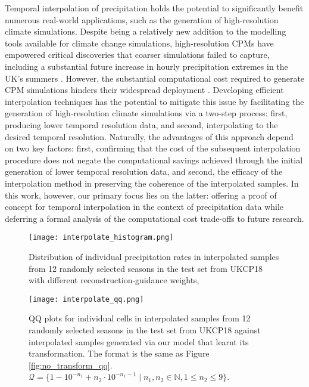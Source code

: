 \documentclass[ oneside,%
                    author={George Herbert},
                    degree={MSci},
                     title={Video Diffusion Models for Climate Simulations},
                  subtitle={}]{dissertation}
\begin{document}
Temporal interpolation of precipitation holds the potential to significantly benefit numerous real-world applications, such as the generation of high-resolution climate simulations. Despite being a relatively new addition to the modelling tools available for climate change simulations, high-resolution CPMs have empowered critical discoveries that coarser simulations failed to capture, including a substantial future increase in hourly precipitation extremes in the UK's summers \cite{Kendon_Heavier_Summer_Downpours}. However, the substantial computational cost required to generate CPM simulations hinders their widespread deployment \cite{MO_CPM}. Developing efficient interpolation techniques has the potential to mitigate this issue by facilitating the generation of high-resolution climate simulations via a two-step process: first, producing lower temporal resolution data, and second, interpolating to the desired temporal resolution. Naturally, the advantages of this approach depend on two key factors: first, confirming that the cost of the subsequent interpolation procedure does not negate the computational savings achieved through the initial generation of lower temporal resolution data, and second, the efficacy of the interpolation method in preserving the coherence of the interpolated samples. In this work, however, our primary focus lies on the latter: offering a proof of concept for temporal interpolation in the context of precipitation data while deferring a formal analysis of the computational cost trade-offs to future research.

\begin{figure}[htbp]
      \centering
      \texttt{[image: interpolate\_histogram.png]}
      \caption{Distribution of individual precipitation rates in interpolated samples from 12 randomly selected seasons in the test set from UKCP18 with different reconstruction-guidance weights,}
      \label{fig:interpolate_histogram}
\end{figure}

\begin{figure}[htbp]
      \centering
      \texttt{[image: interpolate\_qq.png]}
      \caption{QQ plots for individual cells in interpolated samples from 12 randomly selected seasons in the test set from UKCP18 against interpolated samples generated via our model that learnt its transformation. The format is the same as Figure \ref{fig:no_transform_qq}. $\mathcal{Q} = \{1 - 10^{-n_1} + n_2 \cdot 10^{-n_1 - 1}\mid n_1,n_2\in \mathbb{N}, 1 \le n_2 \le 9\}$.}
      \label{fig:interpolate_qq}
\end{figure}
\end{document}
